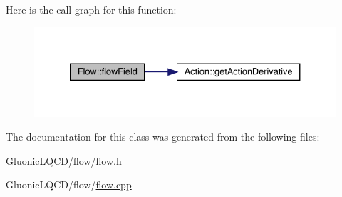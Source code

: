 Here is the call graph for this function\+:\nopagebreak
\begin{figure}[H]
\begin{center}
\leavevmode
\includegraphics[width=334pt]{class_flow_a284b490ddedc9cf5d0f2ab0660c328f6_cgraph}
\end{center}
\end{figure}


The documentation for this class was generated from the following files\+:\begin{DoxyCompactItemize}
\item 
Gluonic\+L\+Q\+C\+D/flow/\mbox{\hyperlink{flow_8h}{flow.\+h}}\item 
Gluonic\+L\+Q\+C\+D/flow/\mbox{\hyperlink{flow_8cpp}{flow.\+cpp}}\end{DoxyCompactItemize}
